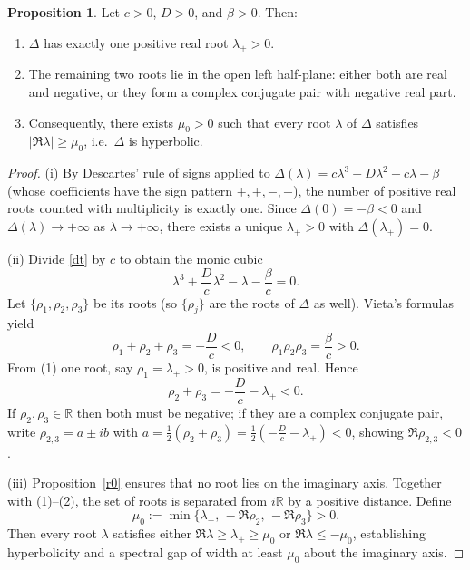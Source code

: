 \documentclass[12pt,letterpaper]{amsart}
\theoremstyle{definition}
\newtheorem{proposition}[theorem]{Proposition}
\theoremstyle{remark}
\numberwithin{equation}{section}
\begin{document}
\begin{proposition}\label{prop:rootcount}
	Let $c>0$, $D>0$, and $\beta>0$. Then:
	\begin{enumerate}
		\item[(i)] $\Delta$ has exactly one positive real root $\lambda_+>0$.
		\item[(ii)] The remaining two roots lie in the open left half-plane: either both are real and negative, or they form a complex conjugate pair with negative real part.
		\item[(iii)] Consequently, there exists $\mu_0>0$ such that every root $\lambda$ of $\Delta$ satisfies $|\Re\lambda|\ge \mu_0$, i.e.\ $\Delta$ is hyperbolic.
	\end{enumerate}
\end{proposition}


\begin{proof}
	(i) By Descartes' rule of signs applied to $\Delta(\lambda)=c\lambda^3+D\lambda^2-c\lambda-\beta$ (whose coefficients have the sign pattern $+,+,-,-$), the number of positive real roots counted with multiplicity is exactly one. Since $\Delta(0)=-\beta<0$ and $\Delta(\lambda)\to+\infty$ as $\lambda\to+\infty$, there exists a unique $\lambda_+>0$ with $\Delta(\lambda_+)=0$.
	
	(ii) Divide \eqref{dt} by $c$ to obtain the monic cubic
	$$
	\lambda^3 + \frac{D}{c}\lambda^2 - \lambda - \frac{\beta}{c}=0.
	$$
	Let $\{\rho_1,\rho_2,\rho_3\}$ be its roots (so $\{\rho_j\}$ are the roots of $\Delta$ as well). Vieta's formulas yield
	$$
	\rho_1+\rho_2+\rho_3 = -\frac{D}{c} < 0, 
	\qquad 
	\rho_1\rho_2\rho_3 = \frac{\beta}{c} > 0 .
	$$
	From (1) one root, say $\rho_1=\lambda_+>0$, is positive and real. Hence
	$$
	\rho_2+\rho_3 = -\frac{D}{c} - \lambda_+ < 0.
	$$
	If $\rho_2,\rho_3\in\mathbb{R}$ then both must be negative; if they are a complex conjugate pair, write $\rho_{2,3}=a\pm i b$ with $a=\frac{1}{2}(\rho_2+\rho_3)=\tfrac12(-\frac{D}{c}-\lambda_+)<0$, showing $\Re\rho_{2,3}<0$.
	
	(iii) Proposition~\ref{r0} ensures that no root lies on the imaginary axis. Together with (1)–(2), the set of roots is separated from $i\mathbb{R}$ by a positive distance. Define
	$$
	\mu_0 := \min\big\{\lambda_+,\, -\Re\rho_2,\, -\Re\rho_3\big\}>0.
	$$
	Then every root $\lambda$ satisfies either $\Re\lambda\ge \lambda_+\ge \mu_0$ or $\Re\lambda\le -\mu_0$, establishing hyperbolicity and a spectral gap of width at least $\mu_0$ about the imaginary axis.
\end{proof}
\end{document}
